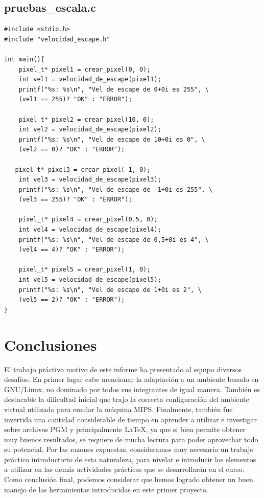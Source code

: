 \documentclass[a4paper,10pt]{article}
\begin{document}
\subsection{pruebas\_escala.c}
\begin{verbatim}
#include <stdio.h>
#include "velocidad_escape.h"

int main(){
	pixel_t* pixel1 = crear_pixel(0, 0);
	int vel1 = velocidad_de_escape(pixel1);
	printf("%s: %s\n", "Vel de escape de 0+0i es 255", \
	(vel1 == 255)? "OK" : "ERROR");

	pixel_t* pixel2 = crear_pixel(10, 0);
	int vel2 = velocidad_de_escape(pixel2);
	printf("%s: %s\n", "Vel de escape de 10+0i es 0", \
	(vel2 == 0)? "OK" : "ERROR");
	
   pixel_t* pixel3 = crear_pixel(-1, 0);
	int vel3 = velocidad_de_escape(pixel3);
	printf("%s: %s\n", "Vel de escape de -1+0i es 255", \
	(vel3 == 255)? "OK" : "ERROR");
	
	pixel_t* pixel4 = crear_pixel(0.5, 0);
	int vel4 = velocidad_de_escape(pixel4);
	printf("%s: %s\n", "Vel de escape de 0,5+0i es 4", \
	(vel4 == 4)? "OK" : "ERROR");
	
	pixel_t* pixel5 = crear_pixel(1, 0);
	int vel5 = velocidad_de_escape(pixel5);
	printf("%s: %s\n", "Vel de escape de 1+0i es 2", \
	(vel5 == 2)? "OK" : "ERROR");
}

\end{verbatim}

\pagebreak



\section{Conclusiones}
El trabajo pr\'activo motivo de este informe ha presentado al equipo diversos desaf\'ios. En primer lugar cabe mencionar la adaptaci\'on a un ambiente basado en GNU/Linux, no dominado por todos sus integrantes de igual manera. Tambi\'en es destacable la dificultad inicial que trajo la correcta configuraci\'on del ambiente virtual utilizado para emular la m\'aquina MIPS. Finalmente, tambi\'en fue invertida una cantidad considerable de tiempo en aprender a utilizar e investigar sobre archivos PGM y principalmente \LaTeX{}, ya que si bien permite obtener muy buenos resultados, se requiere de mucha lectura para poder aprovechar todo su potencial.
Por las razones expuestas, consideramos muy necesario un trabajo pr\'actico introductorio de esta naturaleza, para nivelar e introducir los elementos a utilizar en las dem\'as actividades pr\'acticas que se desarrollar\'an en el curso.\\
Como conclusi\'on final, podemos considerar que hemos logrado obtener un buen manejo de las herramientas introducidas en este primer proyecto.
\end{document}
